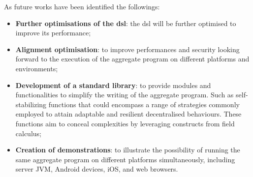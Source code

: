 As future works have been identified the followings:
\begin{itemize}
    \item \textbf{Further optimisations of the \ac{dsl}}: the \ac{dsl} will be further optimised to improve its performance;
    \item \textbf{Alignment optimisation}: to improve performances and security looking forward to the execution of the aggregate
        program on different platforms and environments;
    \item \textbf{Development of a standard library}: to provide modules and functionalities to simplify the writing of the aggregate program.
        Such as self-stabilizing functions that could encompass a range of strategies commonly employed to attain adaptable
        and resilient decentralised behaviours.
        These functions aim to conceal complexities by leveraging constructs from field calculus;
    \item \textbf{Creation of demonstrations}: to illustrate the possibility of running the same aggregate program on
        different platforms simultaneously, including server JVM, Android devices, iOS, and web browsers.
\end{itemize}
